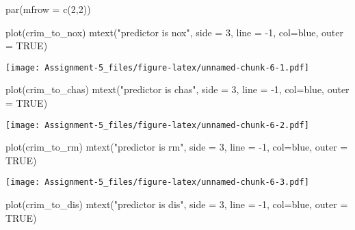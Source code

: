 \documentclass[
]{article}
\newenvironment{Shaded}{\begin{snugshade}}{\end{snugshade}}
\newcommand{\AttributeTok}[1]{\textcolor[rgb]{0.77,0.63,0.00}{#1}}
\newcommand{\ConstantTok}[1]{\textcolor[rgb]{0.00,0.00,0.00}{#1}}
\newcommand{\DecValTok}[1]{\textcolor[rgb]{0.00,0.00,0.81}{#1}}
\newcommand{\FunctionTok}[1]{\textcolor[rgb]{0.00,0.00,0.00}{#1}}
\newcommand{\NormalTok}[1]{#1}
\newcommand{\SpecialCharTok}[1]{\textcolor[rgb]{0.00,0.00,0.00}{#1}}
\newcommand{\StringTok}[1]{\textcolor[rgb]{0.31,0.60,0.02}{#1}}
\begin{document}
\begin{Shaded}
\begin{Highlighting}[]
\FunctionTok{par}\NormalTok{(}\AttributeTok{mfrow =} \FunctionTok{c}\NormalTok{(}\DecValTok{2}\NormalTok{,}\DecValTok{2}\NormalTok{))}

\FunctionTok{plot}\NormalTok{(crim\_to\_nox)}
\FunctionTok{mtext}\NormalTok{(}\StringTok{"predictor is nox"}\NormalTok{, }\AttributeTok{side =} \DecValTok{3}\NormalTok{, }\AttributeTok{line =} \SpecialCharTok{{-}}\DecValTok{1}\NormalTok{, }\AttributeTok{col=}\StringTok{\textquotesingle{}blue\textquotesingle{}}\NormalTok{, }\AttributeTok{outer =} \ConstantTok{TRUE}\NormalTok{)}
\end{Highlighting}
\end{Shaded}

\texttt{[image: Assignment-5\_files/figure-latex/unnamed-chunk-6-1.pdf]}

\begin{Shaded}
\begin{Highlighting}[]
\FunctionTok{plot}\NormalTok{(crim\_to\_chas)}
\FunctionTok{mtext}\NormalTok{(}\StringTok{"predictor is chas"}\NormalTok{, }\AttributeTok{side =} \DecValTok{3}\NormalTok{, }\AttributeTok{line =} \SpecialCharTok{{-}}\DecValTok{1}\NormalTok{, }\AttributeTok{col=}\StringTok{\textquotesingle{}blue\textquotesingle{}}\NormalTok{, }\AttributeTok{outer =} \ConstantTok{TRUE}\NormalTok{)}
\end{Highlighting}
\end{Shaded}

\texttt{[image: Assignment-5\_files/figure-latex/unnamed-chunk-6-2.pdf]}

\begin{Shaded}
\begin{Highlighting}[]
\FunctionTok{plot}\NormalTok{(crim\_to\_rm)}
\FunctionTok{mtext}\NormalTok{(}\StringTok{"predictor is rm"}\NormalTok{, }\AttributeTok{side =} \DecValTok{3}\NormalTok{, }\AttributeTok{line =} \SpecialCharTok{{-}}\DecValTok{1}\NormalTok{, }\AttributeTok{col=}\StringTok{\textquotesingle{}blue\textquotesingle{}}\NormalTok{, }\AttributeTok{outer =} \ConstantTok{TRUE}\NormalTok{)}
\end{Highlighting}
\end{Shaded}

\texttt{[image: Assignment-5\_files/figure-latex/unnamed-chunk-6-3.pdf]}

\begin{Shaded}
\begin{Highlighting}[]
\FunctionTok{plot}\NormalTok{(crim\_to\_dis)}
\FunctionTok{mtext}\NormalTok{(}\StringTok{"predictor is dis"}\NormalTok{, }\AttributeTok{side =} \DecValTok{3}\NormalTok{, }\AttributeTok{line =} \SpecialCharTok{{-}}\DecValTok{1}\NormalTok{, }\AttributeTok{col=}\StringTok{\textquotesingle{}blue\textquotesingle{}}\NormalTok{, }\AttributeTok{outer =} \ConstantTok{TRUE}\NormalTok{)}
\end{Highlighting}
\end{Shaded}
\end{document}
